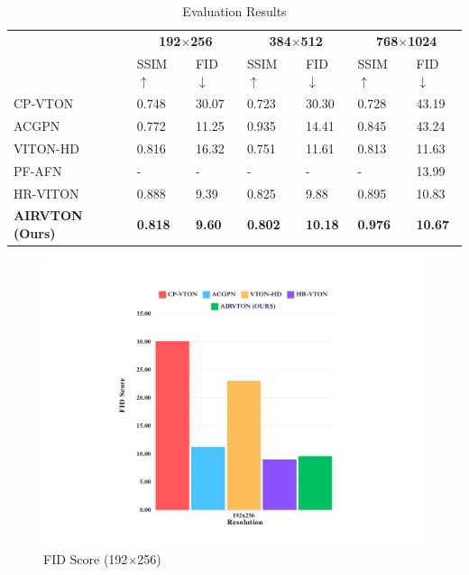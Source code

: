 \begin{table}[htbp]
    \caption{Evaluation Results}
    \label{tab:evaluation_results}
    \centering
    \begin{tabular}[htbp]{|l|l|l|l|l|l|l|}
    \hline
        ~ &  \multicolumn{2}{c|}{\textbf{192$\times$256}} &  \multicolumn{2}{c|}{\textbf{384$\times$512}} & \multicolumn{2}{c|}{\textbf{768$\times$1024}} \\ 
        ~ &  SSIM ${\uparrow}$ &  FID ${\downarrow}$ &  SSIM ${\uparrow}$  &  FID ${\downarrow}$ &  SSIM ${\uparrow}$ &  FID ${\downarrow}$ \\ \hline
        CP-VTON &  0.748  &  30.07  &  0.723  &  30.30  &  0.728  &  43.19  \\ 
        ACGPN &  0.772  &  11.25  &  0.935  &  14.41  &  0.845  &  43.24  \\ 
        VITON-HD &  0.816  &  16.32  &  0.751  &  11.61  &  0.813  &  11.63  \\ 
        PF-AFN &  -    &  -    &  -    &  -    &  -    &  13.99  \\ 
        HR-VITON &  0.888  &  9.39  &  0.825  &  9.88  &  0.895  &  10.83  \\ 
        \textbf{AIRVTON (Ours)} &  \textbf{0.818}  &  \textbf{9.60}  &  \textbf{0.802}  &  \textbf{10.18}  &  \textbf{0.976}  &  \textbf{10.67}  \\ \hline
    \end{tabular}
\end{table}

\begin{figure}
    \includegraphics[width=\textwidth]{components/images/2.png}
    \caption{FID Score (192$\times$256)}
    \label{fig:fid-score-low}
\end{figure}

